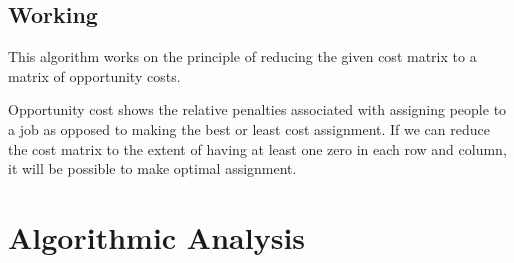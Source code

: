 \documentclass[conference]{IEEEtran}
\begin{document}
\subsection{Working}

This algorithm works on the principle of reducing the given cost matrix to a matrix of opportunity costs.

Opportunity cost shows the relative penalties associated with assigning people to a job as opposed to making the best or least cost assignment. If we can reduce the cost matrix to the extent of having at least one zero in each row and column, it will be possible to make optimal assignment.


\section{Algorithmic Analysis}
\end{document}
